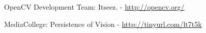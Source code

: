 \begin{thebibliography}{11}
		OpenCV Development Team: Itseez.  -  \url{http://opencv.org/}
		
	MediaCollege: Persistence of Vision  - \url{http://tinyurl.com/lt7t5k}
	
\end{thebibliography}